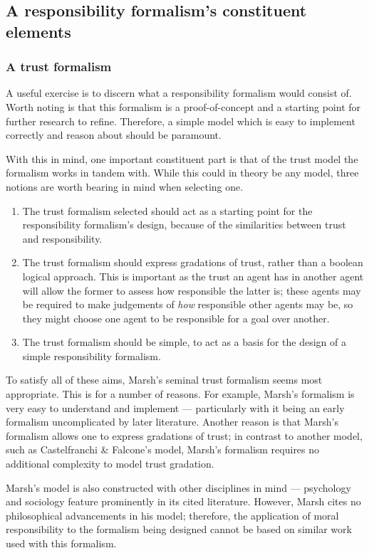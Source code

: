 \subsection{A responsibility formalism's constituent elements}
\subsubsection{A trust formalism}
A useful exercise is to discern what a responsibility formalism would consist of. Worth noting is that this formalism is a proof-of-concept and a starting point for further research to refine. Therefore, a simple model which is easy to implement correctly and reason about should be paramount.\par

With this in mind, one important constituent part is that of the trust model the formalism works in tandem with. While this could in theory be any model, three notions are worth bearing in mind when selecting one.
\begin{enumerate}
    \item The trust formalism selected should act as a starting point for the responsibility formalism's design, because of the similarities between trust and responsibility.
    \item The trust formalism should express gradations of trust, rather than a boolean logical approach. This is important as the trust an agent has in another agent will allow the former to assess how responsible the latter is; these agents may be required to make judgements of \emph{how} responsible other agents may be, so they might choose one agent to be responsible for a goal over another.
    \item The trust formalism should be simple, to act as a basis for the design of a simple responsibility formalism.
\end{enumerate}

To satisfy all of these aims, Marsh's seminal trust formalism seems most appropriate. This is for a number of reasons. For example, Marsh's formalism is very easy to understand and implement --- particularly with it being an early formalism uncomplicated by later literature. Another reason is that Marsh's formalism allows one to express gradations of trust; in contrast to another model, such as Castelfranchi \& Falcone's model, Marsh's formalism requires no additional complexity to model trust gradation.\par

Marsh's model is also constructed with other disciplines in mind --- psychology and sociology feature prominently in its cited literature. However, Marsh cites no philosophical advancements in his model; therefore, the application of moral responsibility to the formalism being designed cannot be based on similar work used with this formalism.\par

